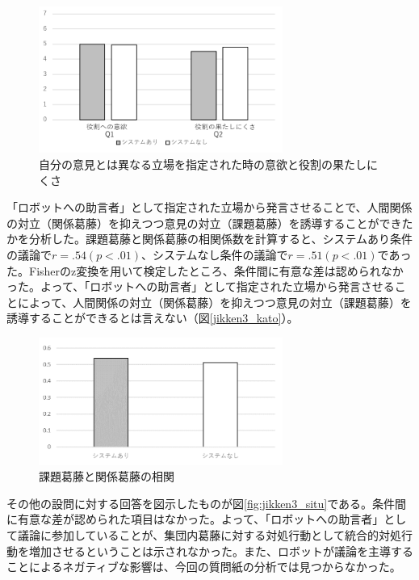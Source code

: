 \documentclass[11pt, a4paper]{jreport} %
\begin{document}
\begin{figure}[htbp]
\begin{center}
\includegraphics[width=80mm]{images/jikken3_iyoku.png}
\caption{自分の意見とは異なる立場を指定された時の意欲と役割の果たしにくさ}
\label{fig:jikken3_iyoku}
\end{center}
\end{figure}


「ロボットへの助言者」として指定された立場から発言させることで、人間関係の対立（関係葛藤）を抑えつつ意見の対立（課題葛藤）を誘導することができたかを分析した。課題葛藤と関係葛藤の相関係数を計算すると、システムあり条件の議論で$r=.54 (p<.01)$、システムなし条件の議論で$r=.51 (p<.01)$であった。Fisherのz変換を用いて検定したところ、条件間に有意な差は認められなかった。よって、「ロボットへの助言者」として指定された立場から発言させることによって、人間関係の対立（関係葛藤）を抑えつつ意見の対立（課題葛藤）を誘導することができるとは言えない（図\ref{jikken3_kato}）。

\begin{figure}[htbp]
\begin{center}
\includegraphics[width=80mm]{images/jikken3_kato.png}
\caption{課題葛藤と関係葛藤の相関}
\label{fig:jikken3_kato}
\end{center}
\end{figure}


その他の設問に対する回答を図示したものが図\ref{fig:jikken3_situ}である。条件間に有意な差が認められた項目はなかった。よって、「ロボットへの助言者」として議論に参加していることが、集団内葛藤に対する対処行動として統合的対処行動を増加させるということは示されなかった。また、ロボットが議論を主導することによるネガティブな影響は、今回の質問紙の分析では見つからなかった。
\end{document}
